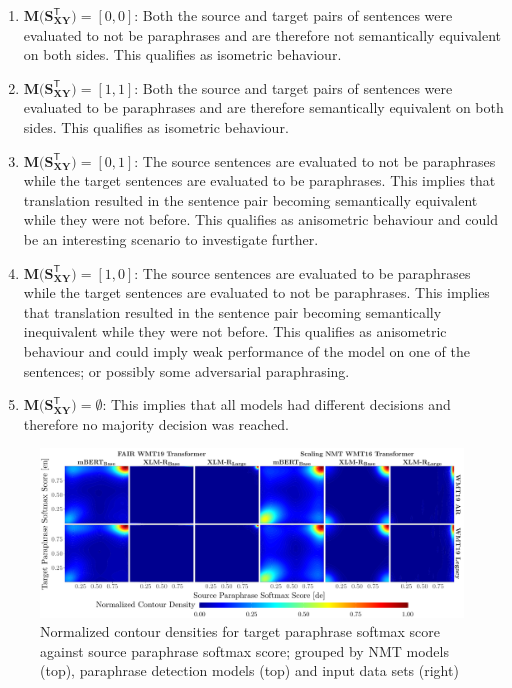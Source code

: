 \documentclass[11pt,a4paper]{article}
\begin{document}
\begin{enumerate}
\item $\mathbf{M(S_{XY}^{\mathsf{T}}}) = [0, 0]$: Both the source and target pairs of sentences were evaluated to not be paraphrases and are therefore not semantically equivalent on both sides. This qualifies as isometric behaviour.
\item $\mathbf{M(S_{XY}^{\mathsf{T}}}) = [1, 1]$: Both the source and target pairs of sentences were evaluated to be paraphrases and are therefore semantically equivalent on both sides. This qualifies as isometric behaviour. 
\item $\mathbf{M(S_{XY}^{\mathsf{T}}}) = [0, 1]$: The source sentences are evaluated to not be paraphrases while the target sentences are evaluated to be paraphrases. This implies that translation resulted in the sentence pair becoming semantically equivalent while they were not before. This qualifies as anisometric behaviour and could be an interesting scenario to investigate further.
\item $\mathbf{M(S_{XY}^{\mathsf{T}}}) = [1, 0]$: The source sentences are evaluated to be paraphrases while the target sentences are evaluated to not be paraphrases. This implies that translation resulted in the sentence pair becoming semantically inequivalent while they were not before. This qualifies as anisometric behaviour and could imply weak performance of the model on one of the sentences; or possibly some adversarial paraphrasing.
\item $\mathbf{M(S_{XY}^{\mathsf{T}}}) = \emptyset$: This implies that all models had different decisions and therefore no majority decision was reached. 
\end{enumerate}

\begin{figure}
  \centering 
  \includegraphics[trim={0cm 0cm 0cm 0cm},clip,width=\textwidth]{paraphrase_detection_softmax_all.pdf}
  \caption{Normalized contour densities for target paraphrase softmax score against source paraphrase softmax score; grouped by NMT models (top), paraphrase detection models (top) and input data sets (right)}
  \label{paraphrase_detection_softmax_all}
\end{figure}
\end{document}
